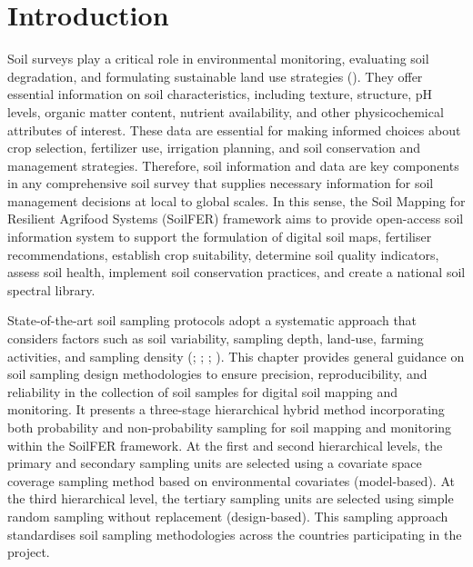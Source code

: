 \documentclass[
  10pt,
  b5paper,
  oneside]{book}
\begin{document}
\section{Introduction}\label{introduction-ssd}

Soil surveys play a critical role in environmental monitoring, evaluating soil degradation, and formulating sustainable land use strategies (). They offer essential information on soil characteristics, including texture, structure, pH levels, organic matter content, nutrient availability, and other physicochemical attributes of interest. These data are essential for making informed choices about crop selection, fertilizer use, irrigation planning, and soil conservation and management strategies. Therefore, soil information and data are key components in any comprehensive soil survey that supplies necessary information for soil management decisions at local to global scales. In this sense, the Soil Mapping for Resilient Agrifood Systems (SoilFER) framework aims to provide open-access soil information system to support the formulation of digital soil maps, fertiliser recommendations, establish crop suitability, determine soil quality indicators, assess soil health, implement soil conservation practices, and create a national soil spectral library.

State-of-the-art soil sampling protocols adopt a systematic approach that considers factors such as soil variability, sampling depth, land-use, farming activities, and sampling density (; ; ; ). This chapter provides general guidance on soil sampling design methodologies to ensure precision, reproducibility, and reliability in the collection of soil samples for digital soil mapping and monitoring. It presents a three-stage hierarchical hybrid method incorporating both probability and non-probability sampling for soil mapping and monitoring within the SoilFER framework. At the first and second hierarchical levels, the primary and secondary sampling units are selected using a covariate space coverage sampling method based on environmental covariates (model-based). At the third hierarchical level, the tertiary sampling units are selected using simple random sampling without replacement (design-based). This sampling approach standardises soil sampling methodologies across the countries participating in the project.
\end{document}
